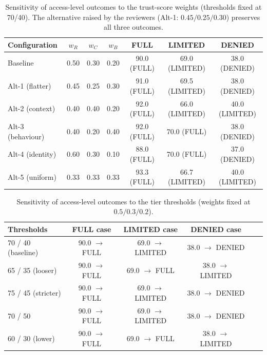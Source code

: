 \begin{table}[t]
  \caption{Sensitivity of access-level outcomes to the trust-score weights
  (thresholds fixed at 70/40). The alternative raised by the reviewers
  (Alt-1: $0.45/0.25/0.30$) preserves all three outcomes.}
  \label{tab:weight-sensitivity}
  \centering
  \begin{tabular}{lcccccc}
    \hline
    \textbf{Configuration} & $w_R$ & $w_C$ & $w_B$
      & \textbf{FULL} & \textbf{LIMITED} & \textbf{DENIED} \\
    \hline
    Baseline           & 0.50 & 0.30 & 0.20 & 90.0 (FULL)    & 69.0 (LIMITED) & 38.0 (DENIED) \\
    Alt-1 (flatter)    & 0.45 & 0.25 & 0.30 & 91.0 (FULL)    & 69.5 (LIMITED) & 38.0 (DENIED) \\
    Alt-2 (context)    & 0.40 & 0.40 & 0.20 & 92.0 (FULL)    & 66.0 (LIMITED) & 40.0 (LIMITED) \\
    Alt-3 (behaviour)  & 0.40 & 0.20 & 0.40 & 92.0 (FULL)    & 70.0 (FULL)    & 38.0 (DENIED) \\
    Alt-4 (identity)   & 0.60 & 0.30 & 0.10 & 88.0 (FULL)    & 70.0 (FULL)    & 37.0 (DENIED) \\
    Alt-5 (uniform)    & 0.33 & 0.33 & 0.33 & 93.3 (FULL)    & 66.7 (LIMITED) & 40.0 (LIMITED) \\
    \hline
  \end{tabular}
\end{table}


\begin{table}[t]
  \caption{Sensitivity of access-level outcomes to the tier thresholds
  (weights fixed at $0.5/0.3/0.2$).}
  \label{tab:threshold-sensitivity}
  \centering
  \begin{tabular}{lccccc}
    \hline
    \textbf{Thresholds} & \textbf{FULL case} & \textbf{LIMITED case} & \textbf{DENIED case} \\
    \hline
    70 / 40 (baseline) & 90.0 $\rightarrow$ FULL    & 69.0 $\rightarrow$ LIMITED & 38.0 $\rightarrow$ DENIED \\
    65 / 35 (looser)   & 90.0 $\rightarrow$ FULL    & 69.0 $\rightarrow$ FULL    & 38.0 $\rightarrow$ LIMITED \\
    75 / 45 (stricter) & 90.0 $\rightarrow$ FULL    & 69.0 $\rightarrow$ LIMITED & 38.0 $\rightarrow$ DENIED \\
    70 / 50            & 90.0 $\rightarrow$ FULL    & 69.0 $\rightarrow$ LIMITED & 38.0 $\rightarrow$ DENIED \\
    60 / 30 (lower)    & 90.0 $\rightarrow$ FULL    & 69.0 $\rightarrow$ FULL    & 38.0 $\rightarrow$ LIMITED \\
    \hline
  \end{tabular}
\end{table}


